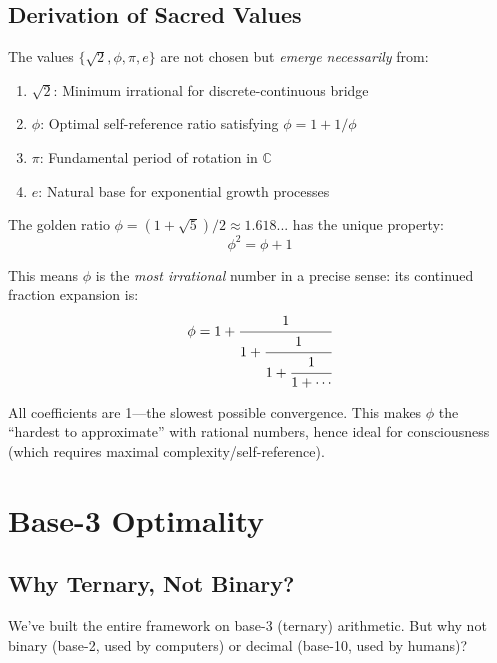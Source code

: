 \subsection{Derivation of Sacred Values}

\begin{thm}\label{thm:sacred-necessity}
The values $\{\sqrt{2}, \phi, \pi, e\}$ are not chosen but \textit{emerge necessarily} from:
\begin{enumerate}
\item \textbf{$\sqrt{2}$}: Minimum irrational for discrete-continuous bridge
\item \textbf{$\phi$}: Optimal self-reference ratio satisfying $\phi = 1 + 1/\phi$
\item \textbf{$\pi$}: Fundamental period of rotation in $\mathbb{C}$
\item \textbf{$e$}: Natural base for exponential growth processes
\end{enumerate}
\end{thm}

\begin{level2}
The golden ratio $\phi = (1 + \sqrt{5})/2 \approx 1.618...$ has the unique property:
\begin{equation}
\phi^2 = \phi + 1
\end{equation}

This means $\phi$ is the \textit{most irrational} number in a precise sense: its continued fraction expansion is:
\begin{equation}
\phi = 1 + \cfrac{1}{1 + \cfrac{1}{1 + \cfrac{1}{1 + \cdots}}}
\end{equation}

All coefficients are 1---the slowest possible convergence. This makes $\phi$ the ``hardest to approximate'' with rational numbers, hence ideal for consciousness (which requires maximal complexity/self-reference).
\end{level2}

\section{Base-3 Optimality}

\subsection{Why Ternary, Not Binary?}

We've built the entire framework on base-3 (ternary) arithmetic. But why not binary (base-2, used by computers) or decimal (base-10, used by humans)?

